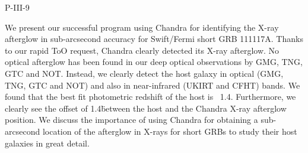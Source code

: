 P-III-9


\bigskip



\bigskip

\noindent We present our successful program using Chandra for identifying the X-ray afterglow in sub-arcsecond accuracy for Swift/Fermi short GRB 111117A. Thanks to our rapid ToO request, Chandra clearly detected its X-ray afterglow.  No optical afterglow has been found in our deep optical observations by GMG, TNG, GTC and NOT.  Instead, we clearly detect the host galaxy in optical (GMG, TNG, GTC and NOT) and also in near-infrared (UKIRT and CFHT) bands.  We found that the best fit photometric redshift of the host is ~1.4. Furthermore, we clearly see the offset of 1.4\" between the host and the Chandra X-ray afterglow position.  We discuss the importance of using Chandra for obtaining a sub-arcsecond location of the afterglow in X-rays for short GRBs to study their host galaxies in great detail.

